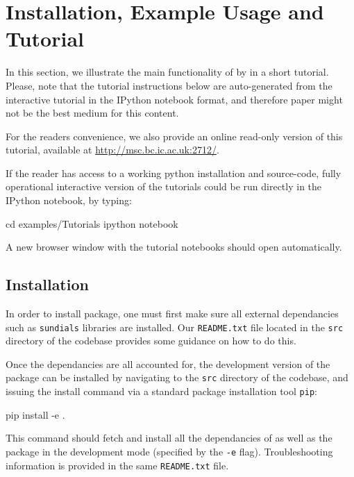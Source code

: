 \section{Installation, Example Usage and Tutorial} \label{examples}
In this section, we illustrate the main functionality of \means{} by in a short tutorial.
Please, note that the tutorial instructions below are auto-generated from the interactive tutorial in the IPython notebook format, and therefore paper might not be the best medium for this content.

For the readers convenience, we also provide an online read-only version of this tutorial, available at \url{http://msc.bc.ic.ac.uk:2712/}. 

If the reader has access to a working python installation and \means{} source-code,
fully operational interactive version of the tutorials could be run directly in the IPython notebook, by typing:

\begin{InputVerbatim}
cd examples/Tutorials
ipython notebook
\end{InputVerbatim}

A new browser window with the tutorial notebooks should open automatically.


\subsection{Installation}

In order to install \means{} package, one must first make sure all external dependancies such as \verb"sundials" libraries \cite{hindmarsh_sundials_2005} are installed. 
Our \verb"README.txt" file located in the \verb"src" directory of the codebase provides some guidance on how to do this.

Once the dependancies are all accounted for, the development version of the \means{} package can be installed by navigating to the \verb"src" directory of the codebase, and issuing the install command via a standard \py{} package installation tool \verb"pip":

\begin{InputVerbatim}
pip install -e .
\end{InputVerbatim}

This command should fetch and install all the dependancies of \means{} as well as the package in the development mode (specified by the \verb"-e" flag). 
Troubleshooting information is provided in the same \verb"README.txt" file.

